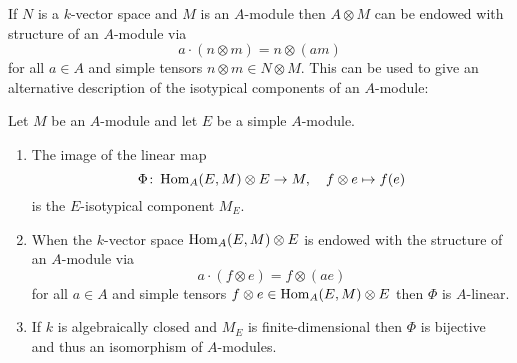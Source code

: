 \begin{fluff}
  If $N$ is a $k$-vector space and $M$ is an $A$-module then $A \otimes M$ can be endowed with structure of an $A$-module via
  \[
      a \cdot (n \otimes m)
    = n \otimes (am)
  \]
  for all $a \in A$ and simple tensors $n \otimes m \in N \otimes M$.
  This can be used to give an alternative description of the isotypical components of an $A$-module:
\end{fluff}


\begin{proposition}
  \label{proposition: isotypical components via hom tensor}
  Let $M$ be an $A$-module and let $E$ be a simple $A$-module.
  \begin{enumerate}
    \item
      The image of the linear map
      \[
                \Phi
        \colon  \operatorname{Hom}_A(E,M) \otimes E
        \to     M,
        \quad   f \otimes e
        \mapsto f(e)
      \]
      is the $E$-isotypical component $M_E$.
    \item
      When the $k$-vector space $\operatorname{Hom}_A(E,M) \otimes E$ is endowed with the structure of an $A$-module via
      \[
          a \cdot (f \otimes e)
        = f \otimes (a e)
      \]
      for all $a \in A$ and simple tensors $f \otimes e \in \operatorname{Hom}_A(E,M) \otimes E$ then $\Phi$ is $A$-linear.
    \item
      If $k$ is algebraically closed and $M_E$ is finite-dimensional then $\Phi$ is bijective and thus an isomorphism of $A$-modules.
  \end{enumerate}
\end{proposition}


